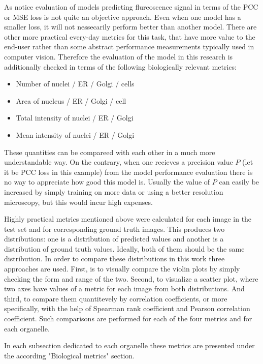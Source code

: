 
As \cite{Lachance_2020} notice evaluation of models predicting flureoscence signal in terms of the PCC or MSE loss is not quite an objective approach. Even when one model has a smaller loss, it will not nessecarily perform better than another model. There are other more practical every-day metrics for this task, that have more value to the end-user rather than some abstract performance measurements typically used in computer vision. Therefore the evaluation of the model in this research is additionally checked in terms of the following biologically relevant metrics:
\begin{itemize}
    \item Number of nuclei / ER / Golgi / cells
    \item Area of nucleus / ER / Golgi / cell
    \item Total intensity of nuclei / ER / Golgi
    \item Mean intensity of nuclei / ER / Golgi
\end{itemize}

These quantities can be compareed with each other in a much more understandable way. On the contrary, when one recieves a precision value $P$ (let it be PCC loss in this example) from the model performance evaluation there is no way to appreciate how good this model is. Usually the value of $P$ can easily be increased by simply training on more data or using a better resolution microscopy, but this would incur high expenses.

Highly practical metrics mentioned above were calculated for each image in the test set and for corresponding ground truth images. This produces two distributions: one is a distribution of predicted values and another is a distribution of ground truth values. Ideally, both of them should be the same distribution. In order to compare these distributions in this work three approaches are used. First, is to visually compare the violin plots by simply checking the form and range of the two. Second, to visualize a scatter plot, where two axes have values of a metric for each image from both distributions. And third, to compare them quantitevely by correlation coefficients, or more specifically, with the help of Spearman rank coefficient and Pearson correlation coefficient. Such comparisons are performed for each of the four metrics and for each organelle.

In each subsection dedicated to each organelle these metrics are presented under the according "Biological metrics" section.